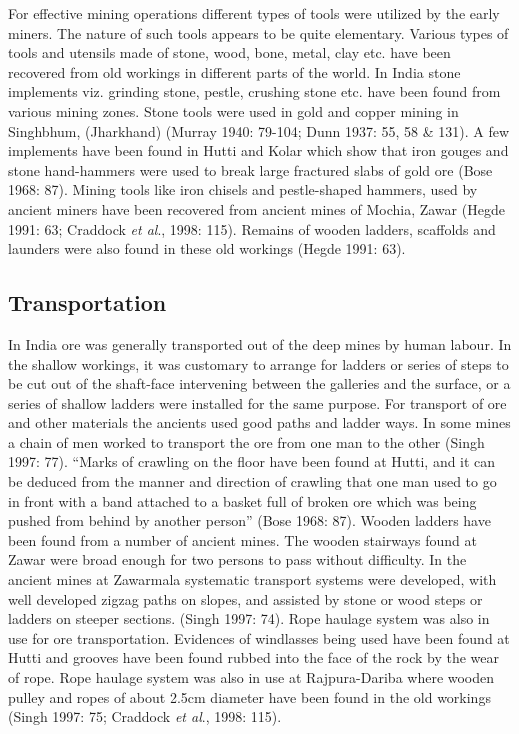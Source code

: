 For effective mining operations different types of tools were utilized by the early miners. The nature of such tools appears to be quite elementary. Various types of tools and utensils made of stone, wood, bone, metal, clay etc. have been recovered from old workings in different parts of the world. In India stone implements viz. grinding stone, pestle, crushing stone etc. have been found from various mining zones. Stone tools were used in gold and copper mining in Singhbhum, (Jharkhand) (Murray 1940: 79-104; Dunn 1937: 55, 58 \& 131). A few implements have been found in Hutti and Kolar which show that iron gouges and stone hand-hammers were used to break large fractured slabs of gold ore (Bose 1968: 87). Mining tools like iron chisels and pestle-shaped hammers, used by ancient miners have been recovered from ancient mines of Mochia, Zawar (Hegde 1991: 63; Craddock \textit{et al}., 1998: 115). Remains of wooden ladders, scaffolds and launders were also found in these old workings (Hegde 1991: 63).


\subsection*{Transportation}

In India ore was generally transported out of the deep mines by human labour. In the shallow workings, it was customary to arrange for ladders or series of steps to be cut out of the shaft-face intervening between the galleries and the surface, or a series of shallow ladders were installed for the same purpose. For transport of ore and other materials the ancients used good paths and ladder ways. In some mines a chain of men worked to transport the ore from one man to the other (Singh 1997: 77). “Marks of crawling on the floor have been found at Hutti, and it can be deduced from the manner and direction of crawling that one man used to go in front with a band attached to a basket full of broken ore which was being pushed from behind by another person” (Bose 1968: 87). Wooden ladders have been found from a number of ancient mines. The wooden stairways found at Zawar were broad enough for two persons to pass without difficulty. In the ancient mines at Zawarmala systematic transport systems were developed, with well developed zigzag paths on slopes, and assisted by stone or wood steps or ladders on steeper sections. (Singh 1997: 74). Rope haulage system was also in use for ore transportation. Evidences of windlasses being used have been found at Hutti and grooves have been found rubbed into the face of the rock by the wear of rope. Rope haulage system was also in use at Rajpura-Dariba where wooden pulley and ropes of about 2.5cm diameter have been found in the old workings (Singh 1997: 75; Craddock \textit{et al}., 1998: 115).

